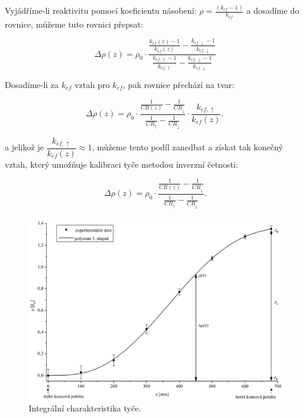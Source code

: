 Vyjádříme-li reaktivitu pomocí koeficientu násobení: $\rho = \frac{(k_{ef} - 1)}{k_{ef}}$ a dosadíme do rovnice, můžeme tuto rovnici přepsat:

\begin{equation*}
\Delta \rho(z) = \rho_0 \cdot \frac{\frac{k_{ef}(z) - 1}{k_{ef}(z)} - \frac{k_{ef,\downarrow} - 1}{k_{ef,\downarrow}}}{\frac{k_{ef,\uparrow} - 1}{k_{ef,\uparrow}} - \frac{k_{ef,\downarrow} - 1}{k_{ef,\downarrow}}}
\end{equation*}

Dosadíme-li za $ k_{ef} $ vztah pro $k_{ef}$, pak rovnice přechází na tvar:

\begin{equation*}
\Delta \rho(z) = \rho_0 \cdot \frac{\frac{1}{CR(z)} - \frac{1}{CR_\downarrow}}{\frac{1}{CR_\uparrow} - \frac{1}{CR_\downarrow}} \cdot \dfrac{k_{ef, \uparrow}}{k_{ef}(z)},
\end{equation*}

a jelikož je $\dfrac{k_{ef, \uparrow}}{k_{ef}(z)} \approx 1$, můžeme tento podíl zanedbat a získat tak konečný vztah, který umožňuje kalibraci tyče metodou inverzní četnosti:

\begin{equation}
\boxed{\Delta \rho(z) = \rho_0 \cdot \frac{\frac{1}{CR(z)} - \frac{1}{CR_\downarrow}}{\frac{1}{CR_\uparrow} - \frac{1}{CR_\downarrow}}.}
\end{equation}

\begin{figure}[H]
    \centering
    \includegraphics[scale=0.45]{img/CharakteristikaTyče.png}
    \caption{Integrální charakteristika tyče.}
    \label{fig:charakteristikaTyče}
\end{figure}

